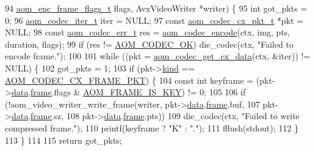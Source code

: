 \begin{DoxyCodeInclude}
{94                         \hyperlink{group__encoder_gacbef92200b831adb94283f84128f83de}{aom\_enc\_frame\_flags\_t} flags, AvxVideoWriter *writer) \{
95   \textcolor{keywordtype}{int} got\_pkts = 0;
96   \hyperlink{group__codec_gadf9e173c9e02788a9999399edab20a02}{aom\_codec\_iter\_t} iter = NULL;
97   \textcolor{keyword}{const} \hyperlink{structaom__codec__cx__pkt}{aom\_codec\_cx\_pkt\_t} *pkt = NULL;
98   \textcolor{keyword}{const} \hyperlink{group__codec_gaaae61e0f8663e6137f1e228757248e7c}{aom\_codec\_err\_t} res = \hyperlink{group__encoder_ga6f4a777de5389771e783df7ff1f116d4}{aom\_codec\_encode}(ctx, img, pts, duration, 
      flags);
99   \textcolor{keywordflow}{if} (res != \hyperlink{group__codec_ggaaae61e0f8663e6137f1e228757248e7caf145dc2f86014a08ebad36ac2b140001}{AOM\_CODEC\_OK}) die\_codec(ctx, \textcolor{stringliteral}{"Failed to encode frame."});
100 
101   \textcolor{keywordflow}{while} ((pkt = \hyperlink{group__encoder_gaedc4c56b60d4217677cb561066360884}{aom\_codec\_get\_cx\_data}(ctx, &iter)) != NULL) \{
102     got\_pkts = 1;
103     \textcolor{keywordflow}{if} (pkt->\hyperlink{structaom__codec__cx__pkt_a11e586120c689ece9a7690e72ff384be}{kind} == \hyperlink{group__encoder_ggafeb69da4a9649a54e805f59c26d8dfeda793165d0f219812342f69d5fd9b2b9c8}{AOM\_CODEC\_CX\_FRAME\_PKT}) \{
104       \textcolor{keyword}{const} \textcolor{keywordtype}{int} keyframe = (pkt->\hyperlink{structaom__codec__cx__pkt_afb379cd4bfa7692d1d6e85f4e4b2b410}{data}.\hyperlink{structaom__codec__cx__pkt_a4180a6ae59b0d295bc915d4689df4cb0}{frame}.flags & \hyperlink{group__encoder_gaf4a58f123913a5eef0a3796f0619e5f3}{AOM\_FRAME\_IS\_KEY}) != 0;
105 
106       \textcolor{keywordflow}{if} (!aom\_video\_writer\_write\_frame(writer, pkt->\hyperlink{structaom__codec__cx__pkt_afb379cd4bfa7692d1d6e85f4e4b2b410}{data}.\hyperlink{structaom__codec__cx__pkt_a4180a6ae59b0d295bc915d4689df4cb0}{frame}.buf,
107                                         pkt->\hyperlink{structaom__codec__cx__pkt_afb379cd4bfa7692d1d6e85f4e4b2b410}{data}.\hyperlink{structaom__codec__cx__pkt_a4180a6ae59b0d295bc915d4689df4cb0}{frame}.sz,
108                                         pkt->\hyperlink{structaom__codec__cx__pkt_afb379cd4bfa7692d1d6e85f4e4b2b410}{data}.\hyperlink{structaom__codec__cx__pkt_a4180a6ae59b0d295bc915d4689df4cb0}{frame}.pts))
109         die\_codec(ctx, \textcolor{stringliteral}{"Failed to write compressed frame."});
110       printf(keyframe ? \textcolor{stringliteral}{"K"} : \textcolor{stringliteral}{"."});
111       fflush(stdout);
112     \}
113   \}
114 
115   \textcolor{keywordflow}{return} got\_pkts;
}
\end{DoxyCodeInclude}
